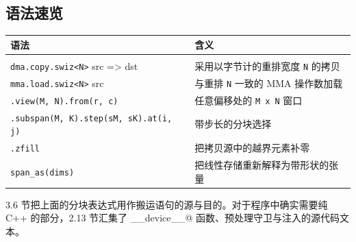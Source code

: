 \subsection*{语法速览}

\begin{table}[htbp]\centering\small
\begin{tabularx}{\linewidth}{@{}lX@{}}
\toprule
\textbf{语法} & \textbf{含义} \\
\midrule
 &  \\
\texttt{dma.copy.swiz\textless{}N\textgreater{}} src =\textgreater{} dst & 采用以字节计的重排宽度 \texttt{N} 的拷贝 \\
\texttt{mma.load.swiz\textless{}N\textgreater{}} src & 与重排 \texttt{N} 一致的 MMA 操作数加载 \\
\texttt{.view(M, N).from(r, c)} & 任意偏移处的 \texttt{M x N} 窗口 \\
\texttt{.subspan(M, K).step(sM, sK).at(i, j)} & 带步长的分块选择 \\
\texttt{.zfill} & 把拷贝源中的越界元素补零 \\
\texttt{span\_as(dims)} & 把线性存储重新解释为带形状的张量 \\
\bottomrule
\end{tabularx}
\end{table}

3.6 节把上面的分块表达式用作搬运语句的源与目的。对于程序中确实需要纯 C++ 的部分，2.13 节汇集了 \co@__device__@ 函数、预处理守卫与注入的源代码文本。
